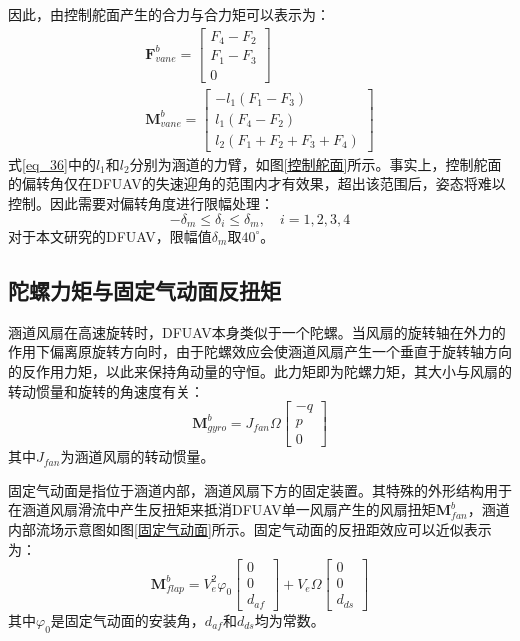 因此，由控制舵面产生的合力与合力矩可以表示为\cite{pflimlinModelingAttitudeControl2010a,manzoorCompositeObserverbasedRobust2023}：
    \begin{gather}
    \boldsymbol{F}_{vane}^b=\begin{bmatrix}
    F_4-F_2 \\ F_1-F_3 \\ 0 
    \end{bmatrix}     \label{eq_35.5}\\
    \boldsymbol{M}_{vane}^b=\begin{bmatrix}
        -l_1(F_1-F_3) \\ l_1(F_4-F_2) \\ l_2(F_1+F_2+F_3+F_4) 
    \end{bmatrix}
    \label{eq_36}
    \end{gather}
式\eqref{eq_36}中的$l_1$和$l_2$分别为涵道的力臂，如图\ref{控制舵面}所示。事实上，控制舵面的偏转角仅在DFUAV的失速迎角的范围内才有效果\cite{9787121348440000}，超出该范围后，姿态将难以控制。因此需要对偏转角度进行限幅处理：
\begin{equation}
    -\delta_m\leq\delta_{i}\leq\delta_m,\quad i=1,2,3,4
    \label{eq_37}
\end{equation}
对于本文研究的DFUAV，限幅值$\delta_m$取$40^\circ$。

\subsection{陀螺力矩与固定气动面反扭矩}

涵道风扇在高速旋转时，DFUAV本身类似于一个陀螺。当风扇的旋转轴在外力的作用下偏离原旋转方向时，由于陀螺效应会使涵道风扇产生一个垂直于旋转轴方向的反作用力矩，以此来保持角动量的守恒。此力矩即为陀螺力矩，其大小与风扇的转动惯量和旋转的角速度有关：
\begin{equation}
    \boldsymbol{M}_{gyro}^b=J_{fan}\Omega
    \begin{bmatrix}
    -q \\ p \\ 0
    \end{bmatrix}
    \label{eq_38}
\end{equation}
其中$J_{fan}$为涵道风扇的转动惯量。

固定气动面是指位于涵道内部，涵道风扇下方的固定装置。其特殊的外形结构用于在涵道风扇滑流中产生反扭矩来抵消DFUAV单一风扇产生的风扇扭矩$\boldsymbol{M}_{fan}^b$，涵道内部流场示意图如图\ref{固定气动面}所示。固定气动面的反扭距效应可以近似表示为\cite{1020333010.nh}：
\begin{equation}
    \boldsymbol{M}_{flap}^b=V_e^2\varphi_0
    \begin{bmatrix}
    0 \\0 \\d_{af}
    \end{bmatrix}
    +V_e\Omega
    \begin{bmatrix}
    0 \\0 \\d_{ds}
    \end{bmatrix}
    \label{eq_39}
\end{equation}
其中$\varphi_0$是固定气动面的安装角，$d_{af}$和$d_{ds}$均为常数。

